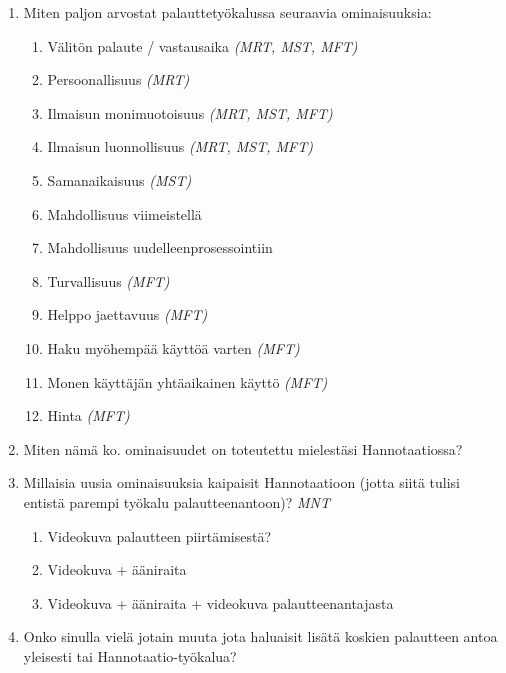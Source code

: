 \documentclass[english,12pt,a4paper,pdftex]{article}
\begin{document}
\begin{enumerate}
\item Miten paljon arvostat palauttetyökalussa seuraavia ominaisuuksia:
  \begin{enumerate}
    \item Välitön palaute / vastausaika \textit{(MRT, MST, MFT)}
    \item Persoonallisuus \textit{(MRT)}
    \item Ilmaisun monimuotoisuus \textit{(MRT, MST, MFT)}
    \item Ilmaisun luonnollisuus \textit{(MRT, MST, MFT)}
    \item Samanaikaisuus \textit{(MST)}
    \item Mahdollisuus viimeistellä 
    \item Mahdollisuus uudelleenprosessointiin 
    \item Turvallisuus \textit{(MFT)}
    \item Helppo jaettavuus \textit{(MFT)}
    \item Haku myöhempää käyttöä varten \textit{(MFT)}
    \item Monen käyttäjän yhtäaikainen käyttö \textit{(MFT)}
    \item Hinta \textit{(MFT)}
  \end{enumerate}
  
\item Miten nämä ko. ominaisuudet on toteutettu mielestäsi Hannotaatiossa?
  
\item Millaisia uusia ominaisuuksia kaipaisit Hannotaatioon (jotta siitä tulisi entistä parempi työkalu palautteenantoon)? \textit{MNT}
  \begin{enumerate}
    \item Videokuva palautteen piirtämisestä?
    \item Videokuva + ääniraita
    \item Videokuva + ääniraita + videokuva palautteenantajasta
  \end{enumerate}

\item Onko sinulla vielä jotain muuta jota haluaisit lisätä koskien palautteen antoa yleisesti tai Hannotaatio-työkalua?
  
\end{enumerate}

\clearpage
\end{document}

